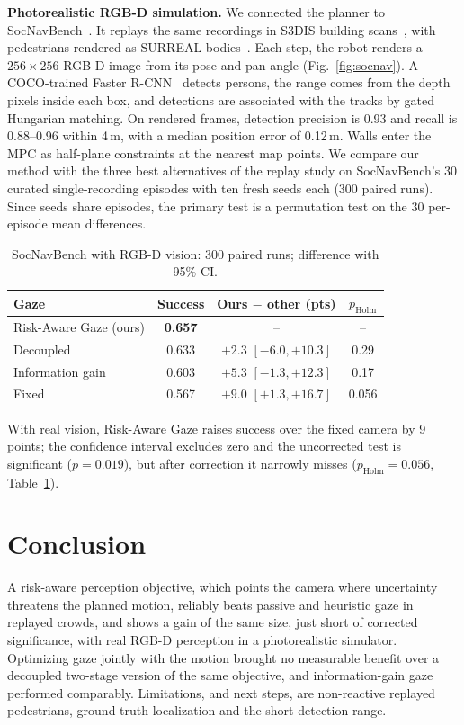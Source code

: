 \documentclass[conference]{IEEEtran}
\begin{document}
\textbf{Photorealistic RGB-D simulation.} We connected the planner to SocNavBench~\cite{socnavbench}. It replays the same recordings in S3DIS building scans~\cite{armeni2016}, with pedestrians rendered as SURREAL bodies~\cite{varol2017}. Each step, the robot renders a $256{\times}256$ RGB-D image from its pose and pan angle (Fig.~\ref{fig:socnav}). A COCO-trained Faster R-CNN~\cite{ren2015} detects persons, the range comes from the depth pixels inside each box, and detections are associated with the tracks by gated Hungarian matching. On rendered frames, detection precision is 0.93 and recall is 0.88--0.96 within 4\,m, with a median position error of 0.12\,m. Walls enter the MPC as half-plane constraints at the nearest map points. We compare our method with the three best alternatives of the replay study on SocNavBench's 30 curated single-recording episodes with ten fresh seeds each (300 paired runs). Since seeds share episodes, the primary test is a permutation test on the 30 per-episode mean differences.

\begin{table}[t]
\centering
\caption{SocNavBench with RGB-D vision: 300 paired runs; difference with 95\% CI.}
\label{tab:socnav}
\footnotesize
\begin{tabular}{lccc}
\toprule
Gaze & Success & Ours $-$ other (pts) & $p_\text{Holm}$ \\
\midrule
Risk-Aware Gaze (ours) & \textbf{0.657} & -- & -- \\
Decoupled         & 0.633 & $+2.3$ $[-6.0, +10.3]$ & 0.29 \\
Information gain  & 0.603 & $+5.3$ $[-1.3, +12.3]$ & 0.17 \\
Fixed             & 0.567 & $+9.0$ $[+1.3, +16.7]$ & 0.056 \\
\bottomrule
\end{tabular}
\vspace{-3mm}
\end{table}

With real vision, Risk-Aware Gaze raises success over the fixed camera by 9 points; the confidence interval excludes zero and the uncorrected test is significant ($p{=}0.019$), but after correction it narrowly misses ($p_\text{Holm}{=}0.056$, Table~\ref{tab:socnav}).

\section{Conclusion}
A risk-aware perception objective, which points the camera where uncertainty threatens the planned motion, reliably beats passive and heuristic gaze in replayed crowds, and shows a gain of the same size, just short of corrected significance, with real RGB-D perception in a photorealistic simulator. Optimizing gaze jointly with the motion brought no measurable benefit over a decoupled two-stage version of the same objective, and information-gain gaze performed comparably. Limitations, and next steps, are non-reactive replayed pedestrians, ground-truth localization and the short detection range.
\end{document}
